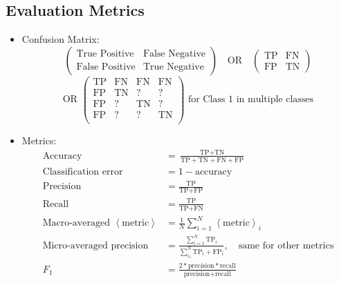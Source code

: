 \documentclass[twocolumn,landscape,10pt]{article}
\theoremstyle{definition}
\begin{document}
\subsection{Evaluation Metrics}

\begin{itemize}
    \item Confusion Matrix:
        \[
            \begin{pmatrix}
                \text{True Positive} & \text{False Negative}\\
                \text{False Positive} & \text{True Negative}
            \end{pmatrix} \quad\text{OR}\quad
            \begin{pmatrix}
                \text{TP} & \text{FN}\\
                \text{FP} & \text{TN}
            \end{pmatrix}
        \]
        \[
            \text{OR }\begin{pmatrix}
                \text{TP} & \text{FN} & \text{FN} & \text{FN}\\
                \text{FP} & \text{TN} & \text{?} & ?\\
                \text{FP} & \text{?} & \text{TN} & ?\\
                \text{FP} & \text{?} & \text{?} & \text{TN}\\
            \end{pmatrix} \text{ for Class 1 in multiple classes}
        \]
    \item Metrics:
        \begin{align*}
            \text{Accuracy}&=\frac{\text{TP}+\text{TN}}{\text{TP}+\text{TN}+\text{FN}+\text{FP}}\\
            \text{Classification error} &= 1 - \text{accuracy}\\
            \text{Precision}&=\frac{\text{TP}}{\text{TP}+\text{FP}}\\
            \text{Recall}&=\frac{\text{TP}}{\text{TP}+\text{FN}}\\
            \text{Macro-averaged }\left\langle\text{metric}\right\rangle&
            =\frac{1}{N}\sum_{i=1}^{N} \left\langle\text{metric}\right\rangle_i\\
            \text{Micro-averaged precision}&=\frac{\sum_{i=1}^{N} \text{TP}_i}
            {\sum_{i_1}^{N} \text{TP}_i + \text{FP}_i},
            \quad\text{same for other metrics}\\
            F_1&=\frac{2*\text{precision}*\text{recall}}{\text{precision}+\text{recall}}\\

\end{align*}
\end{itemize}
\end{document}
